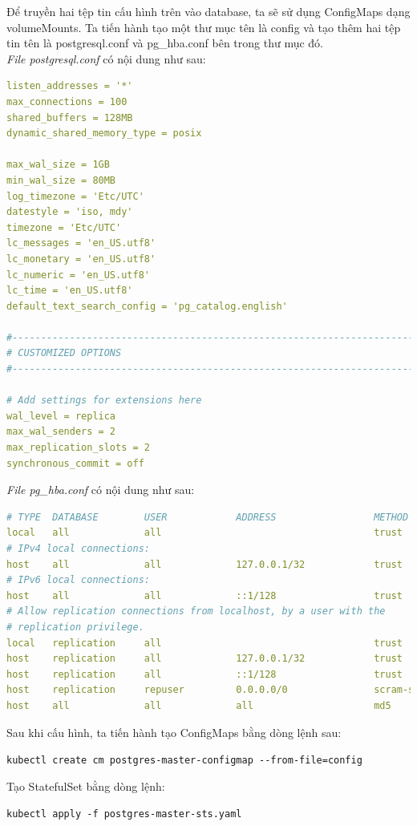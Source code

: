 \noindent Để truyền hai tệp tin cấu hình trên vào database, ta sẽ sử dụng ConfigMaps dạng volumeMounts. Ta tiến hành tạo một thư mục tên là config và tạo thêm hai tệp tin tên là postgresql.conf và pg\_hba.conf bên trong thư mục đó.\\[0.5cm]
\textit{File postgresql.conf} có nội dung như sau:
\begin{lstlisting}[language=yaml]
listen_addresses = '*'
max_connections = 100
shared_buffers = 128MB
dynamic_shared_memory_type = posix

max_wal_size = 1GB
min_wal_size = 80MB
log_timezone = 'Etc/UTC'
datestyle = 'iso, mdy'
timezone = 'Etc/UTC'
lc_messages = 'en_US.utf8'
lc_monetary = 'en_US.utf8'
lc_numeric = 'en_US.utf8'
lc_time = 'en_US.utf8'
default_text_search_config = 'pg_catalog.english'

#------------------------------------------------------------------------------
# CUSTOMIZED OPTIONS
#------------------------------------------------------------------------------

# Add settings for extensions here
wal_level = replica
max_wal_senders = 2
max_replication_slots = 2
synchronous_commit = off
\end{lstlisting}
\textit{File pg\_hba.conf} có nội dung như sau:
\begin{lstlisting}[language=yaml]
# TYPE  DATABASE        USER            ADDRESS                 METHOD
local   all             all                                     trust
# IPv4 local connections:
host    all             all             127.0.0.1/32            trust
# IPv6 local connections:
host    all             all             ::1/128                 trust
# Allow replication connections from localhost, by a user with the
# replication privilege.
local   replication     all                                     trust
host    replication     all             127.0.0.1/32            trust
host    replication     all             ::1/128                 trust
host    replication     repuser         0.0.0.0/0               scram-sha-256
host    all             all             all                     md5
\end{lstlisting}
\noindent Sau khi cấu hình, ta tiến hành tạo ConfigMaps bằng dòng lệnh sau:
\begin{center}
  \lstinline|kubectl create cm postgres-master-configmap --from-file=config|
\end{center}
\noindent Tạo StatefulSet bằng dòng lệnh:
\begin{center}
  \lstinline|kubectl apply -f postgres-master-sts.yaml|
\end{center}

